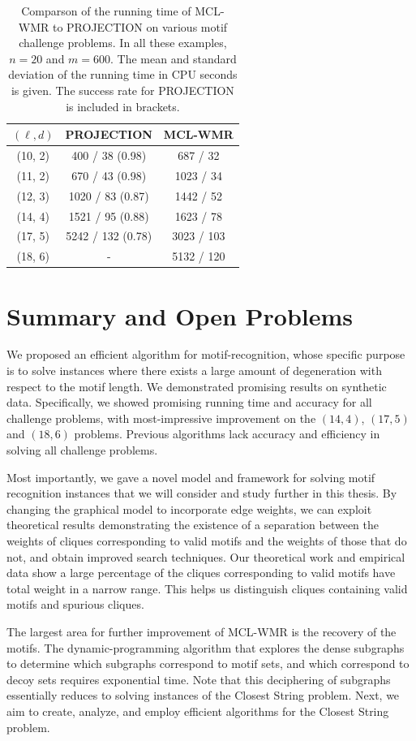 \begin{table}[h!]
\begin{center}
\begin{tabular}{|c|c|c|}
\hline
$(\ell, d)$ 	& PROJECTION 					& MCL-WMR  \\
\hline 
(10, 2) 			& 400 / 38	(0.98)			& 687 / 32 \\
(11, 2) 			& 670 / 43	(0.98)			& 1023 / 34 \\
(12, 3) 			& 1020 / 83 (0.87)			& 1442 / 52 \\
(14, 4) 			& 1521 / 95 (0.88)			& 1623 / 78 \\
(17, 5) 			& 5242 / 132 (0.78)			& 3023 / 103 \\
(18, 6) 			& -									& 5132 / 120 \\
\hline
\end{tabular} 
\end{center}
\caption[Comparson of the time required by MCL-WMR to PROJECTION to various motif challenge problems.]{Comparson of the running time of MCL-WMR to PROJECTION on various motif challenge problems. In all these examples, $n = 20$ and $m = 600$.  The mean and standard deviation of the running time in CPU seconds is given.  The success rate for PROJECTION is included in brackets. }
\label{performance2}
\end{table} 
\label{results}

	
\section{Summary and Open Problems}

We proposed an efficient algorithm for motif-recognition, whose specific purpose is to solve instances where there exists a large amount of degeneration with respect to the motif length.  We demonstrated promising results on synthetic data.  Specifically, we showed promising running time and accuracy for all challenge problems, with most-impressive improvement on the $(14,4)$, $(17,5)$ and $(18,6)$ problems.  Previous algorithms lack accuracy and efficiency in solving all challenge problems.  

Most importantly, we gave a novel model and framework for solving motif recognition instances that we will consider and study further in this thesis.  By changing the graphical model to incorporate edge weights, we can exploit theoretical results demonstrating the existence of a separation between the weights of cliques corresponding to valid motifs and the weights of those that do not, and obtain improved search techniques.   Our theoretical work and empirical data show a large percentage of the cliques corresponding to valid motifs have total weight in a narrow range.  This helps us distinguish cliques containing valid motifs and spurious cliques.  

The largest area for further improvement of MCL-WMR is the recovery of the motifs.  The dynamic-programming algorithm that explores the dense subgraphs to determine which subgraphs correspond to motif sets, and which correspond to decoy sets requires exponential time.  Note that this deciphering of subgraphs essentially reduces to solving instances of the {\sc Closest String} problem.  Next, we aim to create, analyze, and employ efficient algorithms for the {\sc Closest String} problem.  
